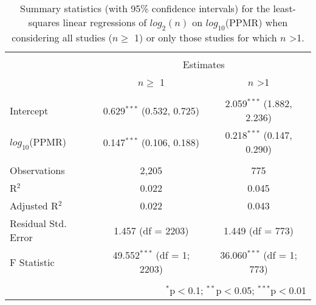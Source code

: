 
\begin{table}[!htbp] \centering 
  \caption{Summary statistics (with 95\% confidence intervals) for the least-squares linear regressions of $log_2(n)$ on $log_{10}$(PPMR) when considering all studies ($n \geq$ 1) or only those studies for which $n$ \textgreater 1.} 
  \label{tab:n-ppmr} 
\begin{tabular}{@{\extracolsep{5pt}}lcc} 
\\[-1.8ex]\hline 
\hline \\[-1.8ex] 
 & \multicolumn{2}{c}{Estimates} \\ 
\cline{2-3} 
 & $n \geq$ 1 & $n$ \textgreater 1 \\ 
\hline \\[-1.8ex] 
 Intercept & 0.629$^{***}$ (0.532, 0.725) & 2.059$^{***}$ (1.882, 2.236) \\ 
  $log_{10}$(PPMR) & 0.147$^{***}$ (0.106, 0.188) & 0.218$^{***}$ (0.147, 0.290) \\ 
 \hline \\[-1.8ex] 
Observations & 2,205 & 775 \\ 
R$^{2}$ & 0.022 & 0.045 \\ 
Adjusted R$^{2}$ & 0.022 & 0.043 \\ 
Residual Std. Error & 1.457 (df = 2203) & 1.449 (df = 773) \\ 
F Statistic & 49.552$^{***}$ (df = 1; 2203) & 36.060$^{***}$ (df = 1; 773) \\ 
\hline 
\hline \\[-1.8ex] 
\multicolumn{3}{r}{$^{*}$p$<$0.1; $^{**}$p$<$0.05; $^{***}$p$<$0.01} \\ 
\end{tabular} 
\end{table} 
